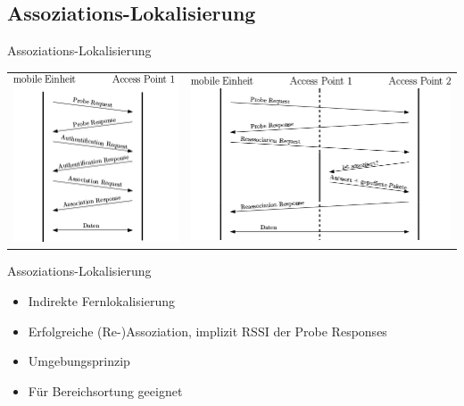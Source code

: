 \documentclass[18pt]{beamer}
\begin{document}
\subsection{Assoziations-Lokalisierung}
\begin{frame}{Assoziations-Lokalisierung}
	\begin{tabular}{cc}
		\includegraphics[height=0.5\textheight]{images/reupper.png} & \includegraphics[height=0.5\textheight]{images/relower.png}\\
	\end{tabular}
	\begin{block}{Assoziations-Lokalisierung}
		\begin{itemize}
			\item Indirekte Fernlokalisierung
			\item Erfolgreiche (Re-)Assoziation, implizit RSSI der Probe Responses
			\item Umgebungsprinzip
			\item Für Bereichsortung geeignet
		\end{itemize}
	\end{block}
\end{frame}
\end{document}
